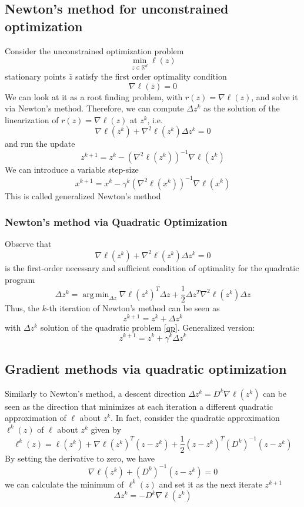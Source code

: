 \documentclass[openany]{book}
\DeclareMathOperator*{\argmin}{arg\,min} %
\newcommand{\R}{\mathbb{R}} %
\theoremstyle{definition}
\theoremstyle{remark}
\begin{document}
\subsection{Newton's method for unconstrained optimization}
Consider the unconstrained optimization problem 
\[
    \min_{z\in\R^d} \ell(z)
\]
stationary points $\bar{z}$ satisfy the first order optimality condition 
\[
    \nabla \ell (\bar{z}) = 0
\]
We can look at it as a root finding problem, with $r(z)=\nabla\ell(z)$, and solve it via Newton's method. Therefore, we can compute $\Delta z^k$ as the solution of the linearization of $r(z)=\nabla\ell(z)$ at $z^k$, i.e. 
\[
    \nabla \ell(z^k) + \nabla^2\ell(z^k)\Delta z^k = 0
\]
and run the update 
\[
    z^{k+1} = z^k -(\nabla^2\ell(z^k))^{-1}\nabla\ell(z^k)
\]
We can introduce a variable step-size 
\[
    x^{k+1} = x^k-\gamma^k(\nabla^2\ell(x^k))^{-1}\nabla\ell(x^k)
\]
This is called generalized Newton's method
\subsubsection{Newton's method via Quadratic Optimization}
Observe that 
\[
    \nabla\ell(z^k) +\nabla^2\ell(z^k)\Delta z^k = 0
\]
is the first-order necessary and sufficient condition of optimality for the quadratic program 
\begin{equation}
    \label{qp}
    \Delta z^k = \argmin_{\Delta z}\nabla\ell(z^k)^T \Delta z+\displaystyle\frac{1}{2}\Delta z^T\nabla^2\ell(z^k)\Delta z
\end{equation}
Thus, the $k$-th iteration of Newton's method can be seen as 
\[
    z^{k+1} = z^k+\Delta z^k
\]
with $\Delta z^k$ solution of the quadratic problem \eqref{qp}. Generalized version: 
\[
    z^{k+1} = z^k + \gamma^k \Delta z^k
\]
\subsection{Gradient methods via quadratic optimization}
Similarly to Newton's method, a descent direction $\Delta z^k=D^k\nabla\ell(z^k)$ can be seen as the direction that minimizes at each iteration a different quadratic approximation of $\ell$ about $z^k$. In fact, consider the quadratic approximation $\ell^k(z)$ of $ \ell$ about $z^k$ given by 
\[
    \ell^k(z) = \ell(z^k)+\nabla\ell(z^k)^T(z-z^k)+\displaystyle\frac{1}{2}(z-z^k)^T(D^k)^{-1}(z-z^k)
\]
By setting the derivative to zero, we have 
\[
    \nabla\ell(z^k)+(D^k)^{-1}(z-z^k)=0
\]
we can calculate the minimum of $\ell^k(z)$ and set it as the next iterate $z^{k+1}$
\[
    \Delta z^k = -D^k\nabla\ell(z^k)
\]
\end{document}
